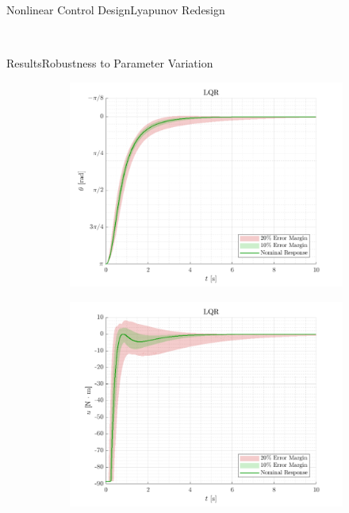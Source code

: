 \begin{frame}{Nonlinear Control Design}{Lyapunov Redesign}
\begin{figure}[H]
\begin{minipage}{0.45\linewidth}
\begin{figure}[H]
      \end{figure}                
    \end{minipage}\hfill \\
  \end{figure}
\end{frame}



\begin{frame}{Results}{Robustness to Parameter Variation}
\begin{figure}[H]
  \begin{minipage}{0.45\linewidth}
    \begin{figure}[H]
      \centering
      \includegraphics[width=\linewidth]{figures/LQR}
    \end{figure}        
  \end{minipage}\hfill      
  \begin{minipage}{0.45\linewidth}
    \begin{figure}[H]
      \centering
      \includegraphics[width=1\linewidth]{figures/LQR_u}

\end{figure}
\end{minipage}
\end{figure}
\end{frame}
